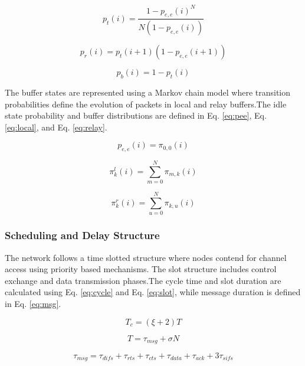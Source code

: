 \documentclass[a4paper,fleqn]{cas-dc}
\numberwithin{equation}{section}
\begin{document}
\begin{equation}
p_t(i) = \frac{1 - p_{e,e}(i)^N}{N(1 - p_{e,e}(i))}
\label{eq:pt}
\end{equation}

\begin{equation}
p_r(i) = p_t(i+1)\left(1 - p_{e,e}(i+1)\right)
\label{eq:pr}
\end{equation}

\begin{equation}
p_b(i) = 1 - p_t(i)
\label{eq:pb}
\end{equation}

The buffer states are represented using a Markov chain model where transition probabilities define the evolution of packets in local and relay buffers.The idle state probability and buffer distributions are defined in Eq. \ref{eq:pee}, Eq. \ref{eq:local}, and Eq. \ref{eq:relay}.

\begin{equation}
p_{e,e}(i) = \pi_{0,0}(i)
\label{eq:pee}
\end{equation}

\begin{equation}
\pi^l_k(i) = \sum_{m=0}^{N} \pi_{m,k}(i)
\label{eq:local}
\end{equation}

\begin{equation}
\pi^r_k(i) = \sum_{u=0}^{N} \pi_{k,u}(i)
\label{eq:relay}
\end{equation}

\subsubsection{Scheduling and Delay Structure}

The network follows a time slotted structure where nodes contend for channel access using priority based mechanisms. The slot structure includes control exchange and data transmission phases.The cycle time and slot duration are calculated using Eq. \ref{eq:cycle} and Eq. \ref{eq:slot}, while message duration is defined in Eq. \ref{eq:msg}.

\begin{equation}
T_c = (\xi + 2)T
\label{eq:cycle}
\end{equation}

\begin{equation}
T = \tau_{msg} + \sigma N
\label{eq:slot}
\end{equation}

\begin{equation}
\tau_{msg} = \tau_{difs} + \tau_{rts} + \tau_{cts} + \tau_{data} + \tau_{ack} + 3\tau_{sifs}
\label{eq:msg}
\end{equation}
\end{document}
